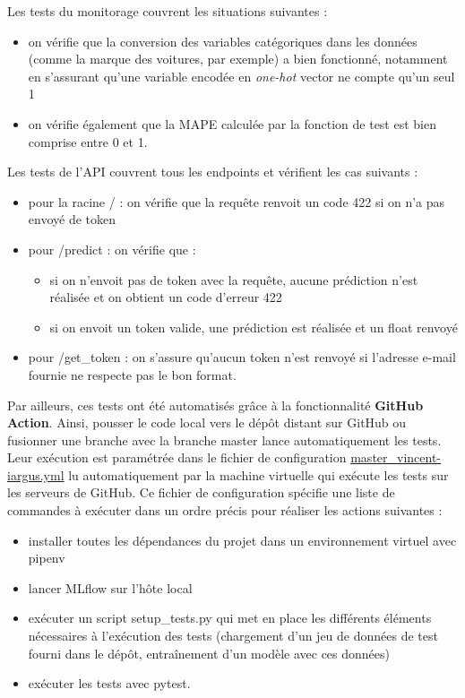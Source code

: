 \documentclass[french]{article}
\begin{document}
    Les tests du monitorage couvrent les situations suivantes :
    \begin{itemize}
        \item on vérifie que la conversion des variables catégoriques dans les données (comme la marque des voitures, par exemple) a bien fonctionné, notamment en s'assurant qu'une variable encodée en \textit{one-hot} vector ne compte qu'un seul 1
        \item on vérifie également que la MAPE calculée par la fonction de test est bien comprise entre 0 et 1.
    \end{itemize}

    Les tests de l'API couvrent tous les endpoints et vérifient les cas suivants :
    \begin{itemize}
        \item pour la racine / : on vérifie que la requête renvoit un code 422 si on n'a pas envoyé de token
        \item pour /predict : on vérifie que :
        \begin{itemize}
            \item si on n'envoit pas de token avec la requête, aucune prédiction n'est réalisée et on obtient un code d'erreur 422
            \item si on envoit un token valide, une prédiction est réalisée et un float renvoyé
        \end{itemize}
        \item pour /get\_token : on s'assure qu'aucun token n'est renvoyé si l'adresse e-mail fournie ne respecte pas le bon format.
    \end{itemize}

    Par ailleurs, ces tests ont été automatisés grâce à la fonctionnalité \textbf{GitHub Action}. Ainsi, pousser le code local vers le dépôt distant sur GitHub ou fusionner une branche avec la branche master lance automatiquement les tests. Leur exécution est paramétrée dans le fichier de configuration \href{https://github.com/vinpap/iargus/blob/fea8247513304d645d6cb4ff5857fe8951ff95e0/.github/workflows/master_vincent-iargus.yml}{master\_vincent-iargus.yml} lu automatiquement par la machine virtuelle qui exécute les tests sur les serveurs de GitHub. Ce fichier de configuration spécifie une liste de commandes à exécuter dans un ordre précis pour réaliser les actions suivantes :
    \begin{itemize}
        \item installer toutes les dépendances du projet dans un environnement virtuel avec pipenv
        \item lancer MLflow sur l'hôte local
        \item exécuter un script setup\_tests.py qui met en place les différents éléments nécessaires à l'exécution des tests (chargement d'un jeu de données de test fourni dans le dépôt, entraînement d'un modèle avec ces données)
        \item exécuter les tests avec pytest.
    \end{itemize}
\end{document}
